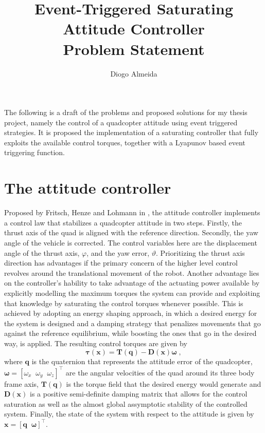 \documentclass{article}
\begin{document}
	\title{Event-Triggered Saturating Attitude Controller\\ \large Problem Statement}
	\author{Diogo Almeida}
	\maketitle	
	The following is a draft of the problems and proposed solutions for my thesis project, namely the control of a quadcopter attitude using event triggered strategies. It is proposed the implementation of a saturating controller that fully exploits the available control torques, together with a Lyapunov based event triggering function.
	
	\section{The attitude controller}
	
		Proposed by Fritsch, Henze and Lohmann in \cite{lohmann_attitude}, the attitude controller implements a control law that stabilizes a quadcopter attitude in two steps. Firstly, the thrust axis of the quad is aligned with the reference direction. Secondly, the yaw angle of the vehicle is corrected. The control variables here are the displacement angle of the thrust axis, $\varphi$, and the yaw error, $\vartheta$. Prioritizing the thrust axis direction has advantages if the primary concern of the higher level control revolves around the translational movement of the robot. Another advantage lies on the controller's hability to take advantage of the actuating power available by explicitly modelling the maximum torques the system can provide and exploiting that knowledge by saturating the control torques whenever possible. This is achieved by adopting an energy shaping approach, in which a desired energy for the system is designed and a damping strategy that penalizes movements that go against the reference equilibrium, while boosting the ones that go in the desired way, is applied. The resulting control torques are given by
		\begin{equation}
			\boldsymbol \tau \mathbf{(x)} = \mathbf{T(q)}-\mathbf{D(x)} \boldsymbol \omega\; ,
			\label{control}
		\end{equation}
		where $\mathbf{q}$ is the quaternion that represents the attitude error of the quadcopter, $\boldsymbol \omega = \left [\omega_x \;\; \omega_y \;\; \omega_z \right ]^\top$ are the angular velocities of the quad around its three body frame axis, $\mathbf{T(q)}$ is the torque field that the desired energy would generate and $\mathbf{D(x)}$ is a positive semi-definite damping matrix that allows for the control saturation as well as the almost global assymptotic stability of the controlled system. Finally, the state of the system with respect to the attitude is given by $\mathbf{x} = \left [ \mathbf{q} \;\; \boldsymbol \omega \right]^\top$. 
\end{document}
